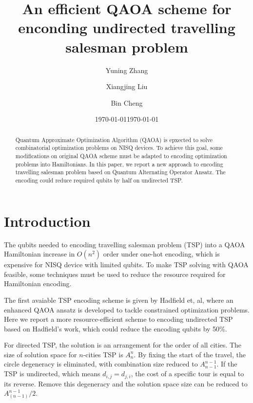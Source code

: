 \documentclass[a4paper, amsfonts, amssymb, amsmath, reprint, showkeys, nofootinbib, twoside]{revtex4-1}
\begin{document}
\preprint{}

\title{An efficient QAOA scheme for enconding undirected travelling salesman problem}
\author{Yuning Zhang}

\date{\today}
\author{Xiangjing Liu}
\author{Bin Cheng}
\date{\today} %
\begin{abstract}
Quantum Approximate Optimization Algorithm (QAOA)\cite{farhi_quantum_2014} is epxected to solve combinatorial optimization problems on NISQ devices. To achieve this goal, some modifications on original QAOA scheme must be adapted to encoding optimization problems into Hamiltonians. In this paper, we report a new approach to encoding travelling salesman problem based on Quantum Alternating Operator Ansatz\cite{hadfield_quantum_2019}. The encoding could reduce required qubits by half on undirected TSP. 

\end{abstract}


\maketitle

\section{Introduction}
The qubits needed to encoding travelling salesman problem (TSP) into a QAOA Hamiltonian increase in $O(n^2)$ order under one-hot encoding, which is expensive for NISQ device with limited qubits. To make TSP solving with QAOA feasible, some techniques must be used to reduce the resource required for Hamiltonian encoding.

The first avaiable TSP encoding scheme is given by Hadfield et, al, where an enhanced QAOA ansatz is developed to tackle constrained optimization problems. Here we report a more resource-efficient scheme to encoding undirected TSP based on Hadfield's work, which could reduce the encoding qubits by 50\%.

For directed TSP, the solution is an arrangement for the order of all cities. The size of solution space for $n$-cities TSP is $A_n^n$. By fixing the start of the travel, the circle degeneracy is eliminated, with combination size reduced to $A_{n-1}^{n-1}$. If the TSP is undirected, which means $d_{i,j}=d_{j,i}$, the cost of a specific tour is equal to its reverse. Remove this degeneracy and the solution space size can be reduced to $A_{(n-1)}^{n-1}/2$.
\end{document}
